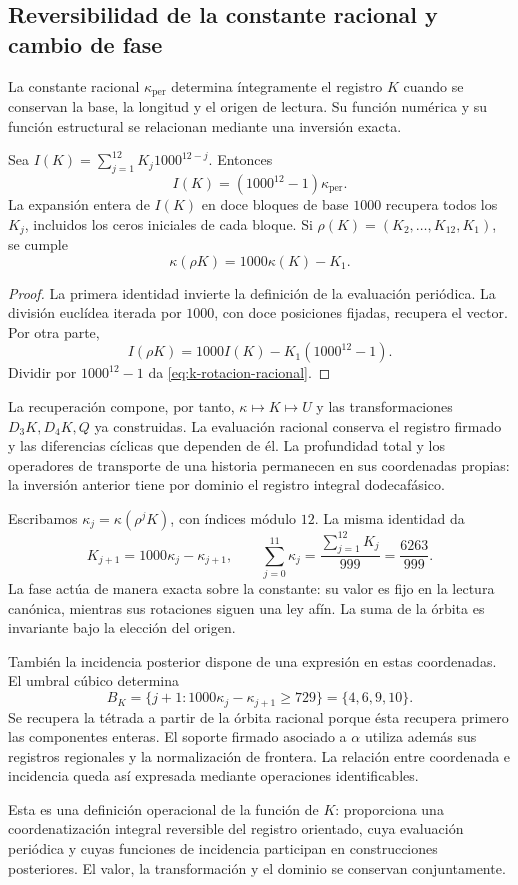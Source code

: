 \subsection{Reversibilidad de la constante racional y cambio de fase}

La constante racional \(\kappa_{\mathrm{per}}\) determina íntegramente
el registro \(K\) cuando se conservan la base, la longitud y el origen
de lectura. Su función numérica y su función estructural se relacionan
mediante una inversión exacta.

\begin{proposition}
Sea \(I(K)=\sum_{j=1}^{12}K_j1000^{12-j}\). Entonces
\[
 I(K)=(1000^{12}-1)\kappa_{\mathrm{per}}.
\]
La expansión entera de \(I(K)\) en doce bloques de base \(1000\)
recupera todos los \(K_j\), incluidos los ceros iniciales de cada bloque.
Si \(\rho(K)=(K_2,\ldots,K_{12},K_1)\), se cumple
\begin{equation}
 \kappa(\rho K)=1000\kappa(K)-K_1.
 \label{eq:k-rotacion-racional}
\end{equation}
\end{proposition}
\begin{proof}
La primera identidad invierte la definición de la evaluación periódica.
La división euclídea iterada por \(1000\), con doce posiciones fijadas,
recupera el vector. Por otra parte,
\[
 I(\rho K)=1000I(K)-K_1(1000^{12}-1).
\]
Dividir por \(1000^{12}-1\) da \eqref{eq:k-rotacion-racional}.
\end{proof}

La recuperación compone, por tanto, \(\kappa\mapsto K\mapsto U\)
y las transformaciones \(D_3K,D_4K,Q\) ya construidas. La evaluación
racional conserva el registro firmado y las diferencias cíclicas que
dependen de él. La profundidad total y los operadores de transporte de
una historia permanecen en sus coordenadas propias: la inversión anterior
tiene por dominio el registro integral dodecafásico.

Escribamos \(\kappa_j=\kappa(\rho^jK)\), con índices módulo \(12\).
La misma identidad da
\[
 K_{j+1}=1000\kappa_j-\kappa_{j+1},\qquad
 \sum_{j=0}^{11}\kappa_j=\frac{\sum_{j=1}^{12}K_j}{999}
 =\frac{6263}{999}.
\]
La fase actúa de manera exacta sobre la constante: su valor es fijo
en la lectura canónica, mientras sus rotaciones siguen una ley afín.
La suma de la órbita es invariante bajo la elección del origen.

También la incidencia posterior dispone de una expresión en estas
coordenadas. El umbral cúbico determina
\[
 B_K=\{j+1:1000\kappa_j-\kappa_{j+1}\ge729\}
 =\{4,6,9,10\}.
\]
Se recupera la tétrada a partir de la órbita racional porque ésta
recupera primero las componentes enteras. El soporte firmado asociado
a \(\alpha\) utiliza además sus registros regionales y la normalización
de frontera. La relación entre coordenada e incidencia queda así
expresada mediante operaciones identificables.

Esta es una definición operacional de la función de \(K\): proporciona
una coordenatización integral reversible del registro orientado, cuya
evaluación periódica y cuyas funciones de incidencia participan en
construcciones posteriores. El valor, la transformación y el dominio
se conservan conjuntamente.

